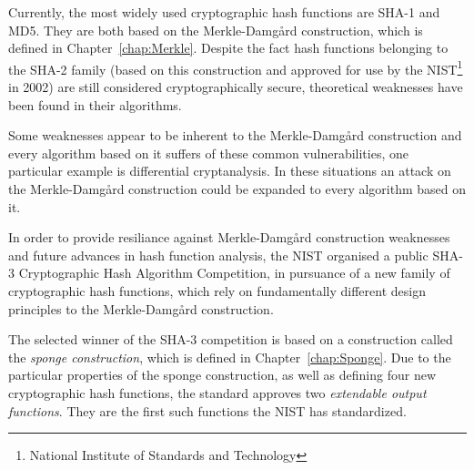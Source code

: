 Currently, the most widely used cryptographic hash functions are \textsc{SHA-1} and \textsc{MD5}. They are both based on the Merkle-Damg\r{a}rd construction, which is defined in Chapter~\ref{chap:Merkle}. Despite the fact hash functions belonging to the \textsc{SHA-2} family (based on this construction and approved for use by the NIST\footnote{National Institute of Standards and Technology} in 2002) are still considered cryptographically secure, theoretical weaknesses have been found in their algorithms.

Some weaknesses appear to be inherent to the Merkle-Damg\r{a}rd construction and every algorithm based on it suffers of these common vulnerabilities, one particular example is differential cryptanalysis. In these situations an attack on the Merkle-Damg\r{a}rd construction could be expanded to every algorithm based on it.

In order to provide resiliance against Merkle-Damg\r{a}rd construction weaknesses and future advances in hash function analysis, the NIST organised a public \textsc{SHA-3} Cryptographic Hash Algorithm Competition, in pursuance of a new family of cryptographic hash functions, which rely on fundamentally different design principles to the Merkle-Damg\r{a}rd construction.

The selected winner of the \textsc{SHA-3} competition is based on a construction called the \emph{sponge construction}, which is defined in Chapter~\ref{chap:Sponge}. Due to the particular properties of the sponge construction, as well as defining four new cryptographic hash functions, the standard approves two \emph{extendable output functions}. They are the first such functions the NIST has standardized.
